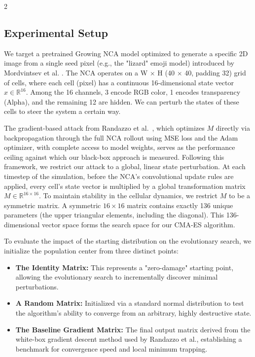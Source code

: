 \documentclass{article}
\begin{document}
\begin{multicols}{2}
\subsection*{Experimental Setup}

We target a pretrained Growing NCA model optimized to generate a specific 2D image from a single seed pixel (e.g., the "lizard" emoji model) introduced by Mordvintsev et al. \cite{mordvintsev2020growing}. 
The NCA operates on a  W $\times$ H (40 $\times$ 40, padding 32) grid of cells, where each cell (pixel) has a continuous 16-dimensional state vector $x \in \mathbb{R}^{16}$. Among the 16 channels, 3 encode RGB color, 1 encodes transparency (Alpha), and the remaining 12 are hidden. We can perturb the states of these cells to steer the system a certain way.

The gradient-based attack from Randazzo et al.~\cite{randazzo2021adversarial}, which optimizes $M$ directly via backpropagation through the full NCA rollout using MSE loss and the Adam optimizer, with complete access to model weights, serves as the performance ceiling against which our black-box approach is measured. 
Following this framework, we restrict our attack to a global, linear state perturbation. 
At each timestep of the simulation, before the NCA's convolutional update rules are applied, every cell's state vector is multiplied by a global transformation matrix $M \in \mathbb{R}^{16 \times 16}$. To maintain stability in the cellular dynamics, we restrict $M$ to be a symmetric matrix.
A symmetric $16 \times 16$ matrix contains exactly 136 unique parameters (the upper triangular elements, including the diagonal). This 136-dimensional vector space forms the search space for our CMA-ES algorithm.


To evaluate the impact of the starting distribution on the evolutionary search, we initialize the population center from three distinct points:
\begin{itemize}
	\item \textbf{The Identity Matrix:} This represents a "zero-damage" starting point, allowing the evolutionary search to incrementally discover minimal perturbations.
	\item \textbf{A Random Matrix:} Initialized via a standard normal distribution to test the algorithm's ability to converge from an arbitrary, highly destructive state.
	\item \textbf{The Baseline Gradient Matrix:} The final output matrix derived from the white-box gradient descent method used by Randazzo et al., establishing a benchmark for convergence speed and local minimum trapping.
\end{itemize}


\end{multicols}
\end{document}
